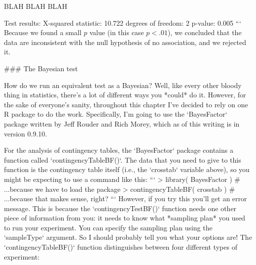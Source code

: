 BLAH BLAH BLAH 

Test results: 
   X-squared statistic:  10.722 
   degrees of freedom:  2 
   p-value:  0.005 
```
Because we found a small $p$ value (in this case $p<.01$), we concluded that the data are inconsistent with the null hypothesis of no association, and we rejected it. 

### The Bayesian test

How do we run an equivalent test as a Bayesian? Well, like every other bloody thing in statistics, there's a lot of different ways you *could* do it. However, for the sake of everyone's sanity, throughout this chapter I've decided to rely on one R package to do the work. Specifically, I'm going to use the `BayesFactor` package written by Jeff Rouder and Rich Morey, which as of this writing is in version 0.9.10. 

For the analysis of contingency tables, the `BayesFactor` package contains a function called `contingencyTableBF()`. The data that you need to give to this function is the contingency table itself (i.e., the `crosstab` variable above), so you might be expecting to use a command like this:
```
> library( BayesFactor )           # ...because we have to load the package
> contingencyTableBF( crosstab )   # ...because that makes sense, right?
```
However, if you try this you'll get an error message. This is because the `contingencyTestBF()` function needs one other piece of information from you: it needs to know what *sampling plan* you used to run your experiment. You can specify the sampling plan using the `sampleType` argument. So I should probably tell you what your options are! The `contingencyTableBF()` function distinguishes between four different types of experiment:


